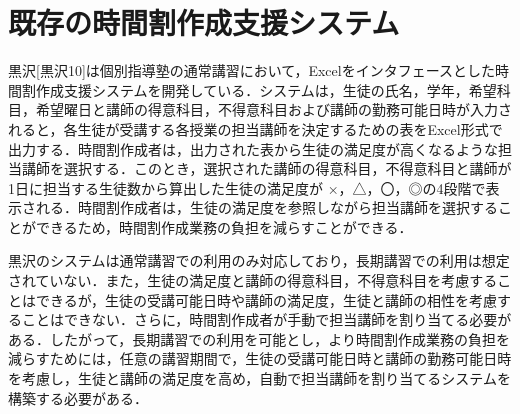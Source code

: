 \chapter{既存の時間割作成支援システム}

黒沢[黒沢10]は個別指導塾の通常講習において，Excelをインタフェースとした時間割作成支援システムを開発している．システムは，生徒の氏名，学年，希望科目，希望曜日と講師の得意科目，不得意科目および講師の勤務可能日時が入力されると，各生徒が受講する各授業の担当講師を決定するための表をExcel形式で出力する．時間割作成者は，出力された表から生徒の満足度が高くなるような担当講師を選択する．このとき，選択された講師の得意科目，不得意科目と講師が1日に担当する生徒数から算出した生徒の満足度が	×，△，〇，◎の4段階で表示される．時間割作成者は，生徒の満足度を参照しながら担当講師を選択することができるため，時間割作成業務の負担を減らすことができる．

黒沢のシステムは通常講習での利用のみ対応しており，長期講習での利用は想定されていない．また，生徒の満足度と講師の得意科目，不得意科目を考慮することはできるが，生徒の受講可能日時や講師の満足度，生徒と講師の相性を考慮することはできない．さらに，時間割作成者が手動で担当講師を割り当てる必要がある．したがって，長期講習での利用を可能とし，より時間割作成業務の負担を減らすためには，任意の講習期間で，生徒の受講可能日時と講師の勤務可能日時を考慮し，生徒と講師の満足度を高め，自動で担当講師を割り当てるシステムを構築する必要がある．